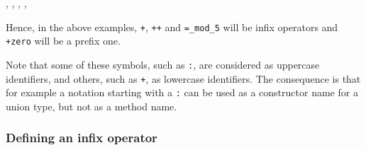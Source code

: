 \begin{syn}
 \is
   \orelse \tok{\tilde} \orelse {} \orelse \tok{\$} \orelse
  \tok{!} \orelse \tok{\#}
\sep
{} \is
  \tok{,} \orelse \tok{+} \orelse \tok{-} \orelse \tok{*} \orelse
  \tok{/} \orelse \tok{\%} \orelse \tok{\&} \orelse \tok{\vertical} \orelse
  \tok{:} \orelse \tok{;} \orelse \tok{<} \orelse \tok{=} \orelse
  \tok{>} \orelse {} \orelse \tok{\chapeau} \orelse
  \tok{\backslash}
\sep
{} \is
   
\sep
{} \is
   
\sep
{} \is
   \orelse {}
\end{syn}


Hence, in the above examples, {\tt +}, {\tt ++} and {\tt =\_mod\_5} will be
infix operators and {\tt \tilde+zero} will be a prefix one.

Note that some of these symbols, such as {\tt :}, are considered as uppercase
identifiers, and others, such as {\tt +}, as lowercase identifiers. The consequence
is that for example a notation starting with a {\tt :} can be used as a constructor
name for a union type, but not as a method name.

\subsubsection{Defining an infix operator}

